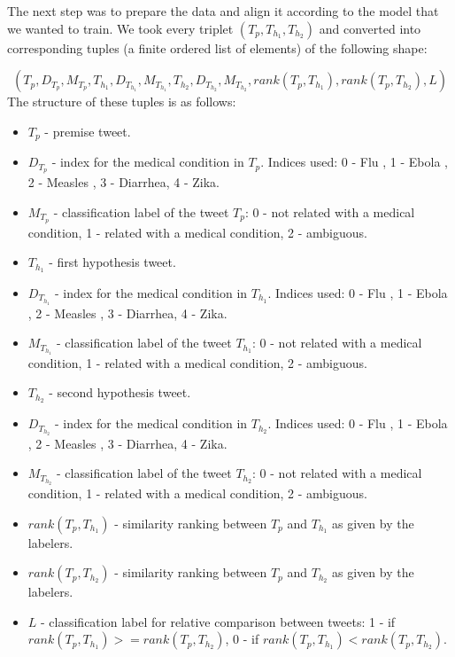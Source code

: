 \documentclass[12pt]{report}
\begin{document}
The next step was to prepare the data and align it according to the model that we wanted to train. We took every triplet $(T_p, T_{h_1}, T_{h_2})$
and converted into corresponding tuples (a finite ordered list of elements) of the following shape:

\[
(T_p, D_{T_p}, M_{T_p}, T_{h_1}, D_{T_{h_1}}, M_{T_{h_1}},T_{h_2}, D_{T_{h_2}}, M_{T_{h_2}}, rank(T_p, T_{h_1}), rank(T_p, T_{h_2}), L)
\]
The structure of these tuples is as follows:
\begin{itemize}
	\item $T_p$ - premise tweet.
	\item $D_{T_p}$ - index for the medical condition in $T_p$. Indices used: 0 - Flu , 1 - Ebola , 2 - Measles  , 3 - Diarrhea, 4 - Zika. 
	\item  $M_{T_p}$ - classification label of the tweet $T_p$: 0 - not related with a medical condition, 1 - related with a medical condition, 2 - ambiguous. 
	\item $T_{h_1}$ - first hypothesis tweet.
	\item $D_{T_{h_1}}$ - index for the medical condition in $T_{h_1}$. Indices used: 0 - Flu , 1 - Ebola , 2 - Measles  , 3 - Diarrhea, 4 - Zika. 
	\item  $M_{T_{h_1}}$ - classification label of the tweet  $T_{h_1}$: 0 - not related with a medical condition, 1 - related with a medical condition, 2 - ambiguous. 
	\item $T_{h_2}$ - second hypothesis tweet.
	\item $D_{T_{h_2}}$ - index for the medical condition in $T_{h_2}$. Indices used: 0 - Flu , 1 - Ebola , 2 - Measles  , 3 - Diarrhea, 4 - Zika. 
	\item  $M_{T_{h_2}}$ - classification label of the tweet $T_{h_2}$: 0 - not related with a medical condition, 1 - related with a medical condition, 2 - ambiguous. 
	\item $rank(T_p, T_{h_1})$ - similarity ranking between $T_p$ and  $T_{h_1}$ as given by the labelers.
	\item $rank(T_p, T_{h_2})$ - similarity ranking between $T_p$ and  $T_{h_2}$ as given by the labelers.
	\item $L$ -  classification label for relative comparison between tweets: 1 - if $rank(T_p, T_{h_1}) >= rank(T_p, T_{h_2})$, 0 - if  $rank(T_p, T_{h_1}) < rank(T_p, T_{h_2})$.
	
\end{itemize}
\end{document}
